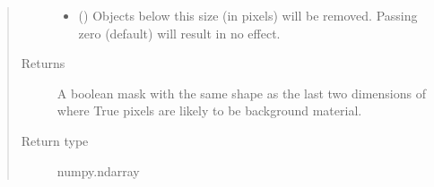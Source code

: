 \documentclass[letterpaper,10pt,english]{sphinxmanual}
\begin{document}
\begin{fulllineitems}
\begin{quote}
\begin{description}
\begin{itemize}
\item {} 
 (\sphinxstyleliteralemphasis{, }) \textendash{} Objects below this size (in pixels) will be removed. Passing
zero (default) will result in no effect.

\end{itemize}

\item[{Returns}] \leavevmode
{} \textendash{} A boolean mask with the same shape as the last two dimensions of
 where True pixels are likely to be background
material.

\item[{Return type}] \leavevmode
numpy.ndarray

\end{description}\end{quote}

\end{fulllineitems}

\end{document}
